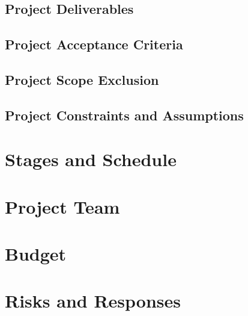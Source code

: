 \documentclass{VUMIFPSkursinis}
\begin{document}
	\subsection{Project Deliverables}

	\subsection{Project Acceptance Criteria}

	\subsection{Project Scope Exclusion}

	\subsection{Project Constraints and Assumptions}

\section{Stages and Schedule}

\section{Project Team}

\section{Budget}

\section{Risks and Responses}
\end{document}
